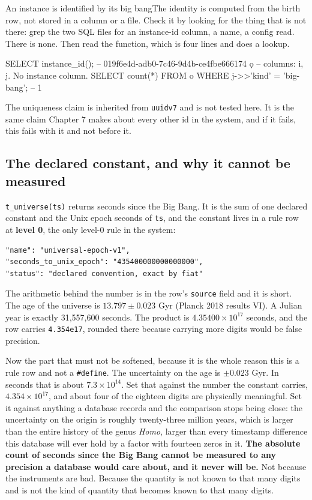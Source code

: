 \begin{Correspondence}{An instance is identified by its big bang}{The identity is computed from the birth row, not stored in a column or a file.}
Check it by looking for the thing that is not there: grep the two SQL files for an instance-id column, a name, a config read. There is none. Then read the function, which is four lines and does a lookup.
\begin{Check}
SELECT instance_id();  -- 019f6e4d-adb0-7c46-9d4b-ce4fbe666174
\d o                   -- columns: i, j. No instance column.
SELECT count(*) FROM o WHERE j->>'kind' = 'big-bang';  -- 1
\end{Check}
The uniqueness claim is inherited from \texttt{uuidv7} and is not tested here. It is the same claim Chapter 7 makes about every other id in the system, and if it fails, this fails with it and not before it.
\end{Correspondence}

\subsection{The declared constant, and why it cannot be measured}

\texttt{t\_universe(ts)} returns seconds since the Big Bang. It is the sum of one declared constant and the Unix epoch seconds of \texttt{ts}, and the constant lives in a rule row at \textbf{level 0}, the only level-0 rule in the system:

\begin{verbatim}
"name": "universal-epoch-v1",
"seconds_to_unix_epoch": "435400000000000000",
"status": "declared convention, exact by fiat"
\end{verbatim}

The arithmetic behind the number is in the row's \texttt{source} field and it is short. The age of the universe is $13.797 \pm 0.023$ Gyr (Planck 2018 results VI). A Julian year is exactly 31{,}557{,}600 seconds. The product is $4.35400 \times 10^{17}$ seconds, and the row carries \texttt{4.354e17}, rounded there because carrying more digits would be false precision.

Now the part that must not be softened, because it is the whole reason this is a rule row and not a \texttt{\#define}. The uncertainty on the age is $\pm 0.023$ Gyr. In seconds that is about $7.3 \times 10^{14}$. Set that against the number the constant carries, $4.354 \times 10^{17}$, and about four of the eighteen digits are physically meaningful. Set it against anything a database records and the comparison stops being close: the uncertainty on the origin is roughly twenty-three million years, which is larger than the entire history of the genus \emph{Homo}, larger than every timestamp difference this database will ever hold by a factor with fourteen zeros in it. \textbf{The absolute count of seconds since the Big Bang cannot be measured to any precision a database would care about, and it never will be.} Not because the instruments are bad. Because the quantity is not known to that many digits and is not the kind of quantity that becomes known to that many digits.

